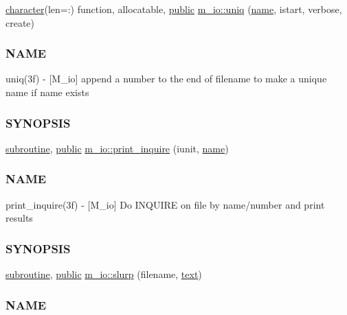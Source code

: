 \begin{DoxyCompactItemize}
\item 
\hyperlink{option__stopwatch_83_8txt_abd4b21fbbd175834027b5224bfe97e66}{character}(len=\+:) function, allocatable, \hyperlink{M__stopwatch_83_8txt_a2f74811300c361e53b430611a7d1769f}{public} \hyperlink{namespacem__io_adf7b5088ef3b4daa6c064d3e264ae821}{m\+\_\+io\+::uniq} (\hyperlink{M__stopwatch_83_8txt_a3f508a893ae4c3b397b4383e33b9bcae}{name}, istart, verbose, create)
\begin{DoxyCompactList}\small\item\em \subsubsection*{N\+A\+ME}

uniq(3f) -\/ \mbox{[}M\+\_\+io\mbox{]} append a number to the end of filename to make a unique name if name exists \subsubsection*{S\+Y\+N\+O\+P\+S\+IS}\end{DoxyCompactList}\item 
\hyperlink{M__stopwatch_83_8txt_acfbcff50169d691ff02d4a123ed70482}{subroutine}, \hyperlink{M__stopwatch_83_8txt_a2f74811300c361e53b430611a7d1769f}{public} \hyperlink{namespacem__io_aa6ee277b2e0f1c263488624b34371fcf}{m\+\_\+io\+::print\+\_\+inquire} (iunit, \hyperlink{M__stopwatch_83_8txt_a3f508a893ae4c3b397b4383e33b9bcae}{name})
\begin{DoxyCompactList}\small\item\em \subsubsection*{N\+A\+ME}

print\+\_\+inquire(3f) -\/ \mbox{[}M\+\_\+io\mbox{]} Do I\+N\+Q\+U\+I\+RE on file by name/number and print results \subsubsection*{S\+Y\+N\+O\+P\+S\+IS}\end{DoxyCompactList}\item 
\hyperlink{M__stopwatch_83_8txt_acfbcff50169d691ff02d4a123ed70482}{subroutine}, \hyperlink{M__stopwatch_83_8txt_a2f74811300c361e53b430611a7d1769f}{public} \hyperlink{namespacem__io_ad25822cde8058cd6861e2d9a5d729ccc}{m\+\_\+io\+::slurp} (filename, \hyperlink{README_8txt_afda9e6898bd09238e9e9be4c62ce246b}{text})
\begin{DoxyCompactList}\small\item\em \subsubsection*{N\+A\+ME}


\end{DoxyCompactList}
\end{DoxyCompactItemize}
